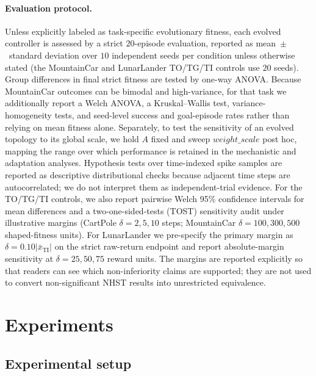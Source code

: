 \documentclass[10pt]{article}
\begin{document}
\paragraph{Evaluation protocol.} Unless explicitly labeled as task-specific
evolutionary fitness, each evolved controller is assessed by a strict
$20$-episode evaluation, reported as mean~$\pm$~standard deviation over $10$
independent seeds per condition unless otherwise stated (the MountainCar and
LunarLander TO/TG/TI controls use $20$ seeds). Group differences in final strict fitness are
tested by one-way ANOVA. Because MountainCar outcomes can be bimodal and
high-variance, for that task we additionally report a Welch ANOVA, a
Kruskal--Wallis test, variance-homogeneity tests, and seed-level success and
goal-episode rates rather than relying on mean fitness alone. Separately, to test
the sensitivity of an evolved topology to its global scale, we hold $A$ fixed and
sweep $\mathit{weight\_scale}$ post hoc, mapping the range over which performance
is retained in the mechanistic and adaptation analyses. Hypothesis tests over
time-indexed spike samples are reported as descriptive distributional checks
because adjacent time steps are autocorrelated; we do not interpret them as
independent-trial evidence. For the TO/TG/TI controls, we also report pairwise
Welch 95\% confidence intervals for mean differences and a two-one-sided-tests
(TOST) sensitivity audit under illustrative margins (CartPole $\delta=2,5,10$
steps; MountainCar $\delta=100,300,500$ shaped-fitness units). For LunarLander
we pre-specify the primary margin as $\delta=0.10|\bar{x}_{\mathrm{TI}}|$ on the
strict raw-return endpoint and report absolute-margin sensitivity at
$\delta=25,50,75$ reward units. The margins are
reported explicitly so that readers can see which non-inferiority claims are
supported; they are not used to convert non-significant NHST results into
unrestricted equivalence.

\section{Experiments}
\label{sec:experiments}

\subsection{Experimental setup}
\label{sec:exp-setup}
\end{document}
